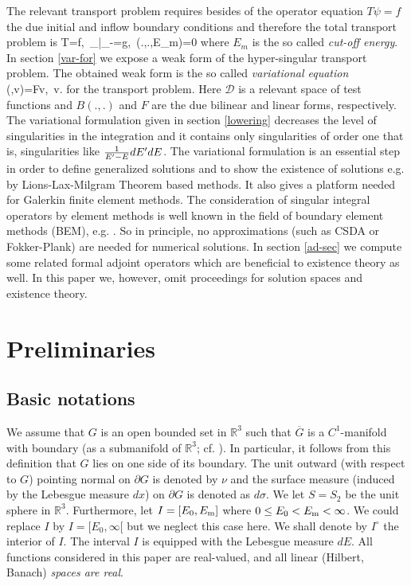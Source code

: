 \documentclass[a4paper,12pt,oneside,reqno]{amsart}
\def\[#1\]{\begin{align*}#1\end{align*}}
\def\be#1\ee{\begin{align}#1\end{align}}
\newcommand{\R}{\mathbb{R}}
\newcommand{\mc}[1]{\mathcal{#1}}
\def\ol#1{\overline{#1}}
\def\[#1\]{\begin{align*}#1\end{align*}}
\def\be#1\ee{\begin{align}#1\end{align}}
\theoremstyle{theorem}
\begin{document}
The relevant transport problem requires besides of the operator equation $T\psi=f$ the due initial and inflow boundary conditions and therefore the total transport problem is
\be\label{tp-intro}
T\psi=f,\ 
\psi_{|\Gamma_-}=g,\
\psi(.,.,E_m)=0
\ee
where $E_m$ is the so called \emph{cut-off energy}.
In  section \ref{var-for} we expose a weak form of the hyper-singular transport problem. The obtained weak form is the so called \emph{variational equation} 
\[
B(\psi,v)=Fv,\ v\in \mc D.
\]
for the transport problem. Here $\mc D$ is a relevant space of test functions and $B(.,.)$ and $F$ are the due bilinear  and linear forms, respectively. The variational formulation given in section \ref{lowering}
decreases the level of singularities in the integration and it contains only singularities of order one that is, singularities like ${1\over{E'-E}}dE' dE$.
The variational formulation is an essential step in order to define generalized solutions and to show the existence of solutions e.g. by Lions-Lax-Milgram Theorem based methods. It also gives a platform needed for Galerkin finite element methods. 
The consideration of singular integral operators by element methods is well known in the field of boundary element methods (BEM), e.g. \cite{costabel}. So in principle, no approximations (such as CSDA or Fokker-Plank) are needed for numerical solutions. 
In section \ref{ad-sec} we compute some related formal adjoint operators which are beneficial to existence theory as well.
In this paper we, however, omit  proceedings for solution spaces and existence theory.



 
 
 

\section{Preliminaries}\label{pre}

 
\subsection{Basic notations}\label{b-f-spaces}

We assume that $G$ is an open bounded 
 set in $\R^3$ such that $\ol{G}$ is a $C^1$-manifold with boundary (as a submanifold of $\R^3$; cf. \cite{lee}).
In particular, it follows from this definition that $G$ lies on one side of its boundary.
The unit outward (with respect to $G$) pointing normal on $\partial G$ is denoted by $\nu$ 
and the surface measure (induced by the Lebesgue measure $dx$) on $\partial G$ is denoted as $d\sigma$.
We let $S=S_2$ be the unit sphere in $\R^3$. 
Furthermore, let $I=[E_0,E_{\rm m}]$  where
$0\leq E_0<E_{\rm m}<\infty$. 
 We could replace $I$ by $I=[E_0,\infty[$ but we neglect this case here.
We shall denote by $I^\circ$ the interior  of $I$.
The interval $I$ is equipped with the Lebesgue measure $dE$.
All functions considered in this paper are real-valued, and all linear (Hilbert, Banach) {\it spaces are real}.
\end{document}

